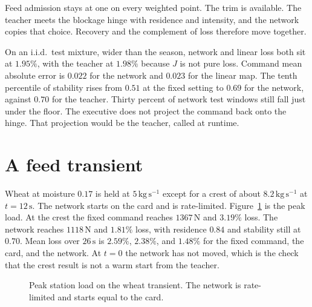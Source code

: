 \documentclass[11pt,a4paper]{article}
\begin{document}
Feed admission stays at one on every weighted point. The trim is available. The teacher meets the blockage hinge with residence and intensity, and the network copies that choice. Recovery and the complement of loss therefore move together.

On an i.i.d.\ test mixture, wider than the season, network and linear loss both sit at \(1.95\%\), with the teacher at \(1.98\%\) because \(J\) is not pure loss. Command mean absolute error is \(0.022\) for the network and \(0.023\) for the linear map. The tenth percentile of stability rises from \(0.51\) at the fixed setting to \(0.69\) for the network, against \(0.70\) for the teacher. Thirty percent of network test windows still fall just under the floor. The executive does not project the command back onto the hinge. That projection would be the teacher, called at runtime.

\section{A feed transient}

Wheat at moisture \(0.17\) is held at \(5\,\mathrm{kg\,s^{-1}}\) except for a crest of about \(8.2\,\mathrm{kg\,s^{-1}}\) at \(t=12\,\mathrm{s}\). The network starts on the card and is rate-limited. Figure~\ref{fig:slug} is the peak load. At the crest the fixed command reaches \(1367\,\mathrm{N}\) and \(3.19\%\) loss. The network reaches \(1118\,\mathrm{N}\) and \(1.81\%\) loss, with residence \(0.84\) and stability still at \(0.70\). Mean loss over \(26\,\mathrm{s}\) is \(2.59\%\), \(2.38\%\), and \(1.48\%\) for the fixed command, the card, and the network. At \(t=0\) the network has not moved, which is the check that the crest result is not a warm start from the teacher.

\begin{figure}[ht]
\centering
{}
\caption{Peak station load on the wheat transient. The network is rate-limited and starts equal to the card.}
\label{fig:slug}
\end{figure}
\end{document}
